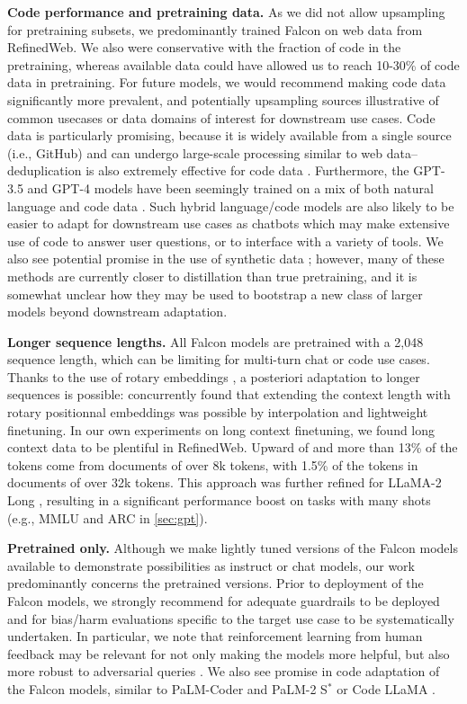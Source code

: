 \documentclass{article}
\begin{document}
\textbf{Code performance and pretraining data.} As we did not allow upsampling for pretraining subsets, we predominantly trained Falcon on web data from RefinedWeb. We also were conservative with the fraction of code in the pretraining, whereas available data could have allowed us to reach 10-30\% of code data in pretraining. For future models, we would recommend making code data significantly more prevalent, and potentially upsampling sources illustrative of common usecases or data domains of interest for downstream use cases. Code data is particularly promising, because it is widely available from a single source (i.e., GitHub) and can undergo large-scale processing similar to web data--deduplication is also extremely effective for code data \citep{kocetkov2022stack, allal2023santacoder, li2023starcoder}. Furthermore, the GPT-3.5 and GPT-4 models have been seemingly trained on a mix of both natural language and code data \citep{openai_modelindex, gpt-4}. Such hybrid language/code models are also likely to be easier to adapt for downstream use cases as chatbots which may make extensive use of code to answer user questions, or to interface with a variety of tools. We also see potential promise in the use of synthetic data \citep{gunasekar2023textbooks, li2023textbooks}; however, many of these methods are currently closer to distillation than true pretraining, and it is somewhat unclear how they may be used to bootstrap a new class of larger models beyond downstream adaptation.

\textbf{Longer sequence lengths.} All Falcon models are pretrained with a 2,048 sequence length, which can be limiting for multi-turn chat or code use cases. Thanks to the use of rotary embeddings \citep{su2021roformer}, a posteriori adaptation to longer sequences is possible: \citet{rope_extension, chen2023extending} concurrently found that extending the context length with rotary positionnal embeddings was possible by interpolation and lightweight finetuning. In our own experiments on long context finetuning, we found long context data to be plentiful in RefinedWeb. Upward of and more than 13\% of the tokens come from documents of over 8k tokens, with 1.5\% of the tokens in documents of over 32k tokens. This approach was further refined for LLaMA-2 Long \citep{xiong2023effective}, resulting in a significant performance boost on tasks with many shots (e.g., MMLU and ARC in \cref{sec:gpt}).

\textbf{Pretrained only.} Although we make lightly tuned versions of the Falcon models available to demonstrate possibilities as instruct or chat models, our work predominantly concerns the pretrained versions. Prior to deployment of the Falcon models, we strongly recommend for adequate guardrails to be deployed and for bias/harm evaluations specific to the target use case to be systematically undertaken. In particular, we note that reinforcement learning from human feedback may be relevant for not only making the models more helpful, but also more robust to adversarial queries \citep{ganguli2022red}. We also see promise in code adaptation of the Falcon models, similar to PaLM-Coder \citep{palm} and PaLM-2 S$^*$ \citep{palm-2} or Code LLaMA \citep{roziere2023code}.
\end{document}
